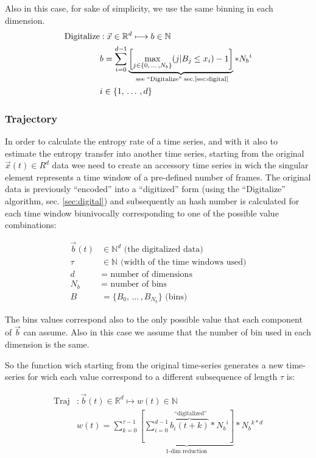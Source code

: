 \documentclass[a4paper]{article}
\begin{document}
Also in this case, for sake of simplicity, we use the same binning in each dimension.
\begin{align*}
 \text{Digitalize} &: \vec{x} \in \mathbb{R}^d \longmapsto b \in \mathbb{N} \\
 { }               & b = \sum_{i=0}^{d-1} \underbrace{\left [ \max_{\substack{j \in \{0,\,\dots\,,N_b\} }} (j | B_j \leq x_i) - 1 \right ]}_{\text{ see ``Digitalize'' sec.\ref{sec:digital}}} * {N_b}^i\\ 
 { }               & i \in \{1,\,\dots\,,d\}
\end{align*}

\subsubsection{Trajectory}\label{sec:traj}
In order to calculate the entropy rate of a time series, and with it also to estimate the entropy transfer into another time series, starting from the original $\vec{x}(t) \in R^d$ data wee need to create an accessory time series in wich the singular element represents a time window of a pre-defined number of frames. The original data is previously ``encoded'' into a ``digitized'' form (using the ``Digitalize'' algorithm, sec. \ref{sec:digital}) and subsequently an hash number is calculated for each time window biunivocally corresponding to one of the possible value combinations:

\begin{align*}
 \vec{b}(t) &\in \mathbb{N}^d \text{ (the digitalized data)}\\
 \tau       &\in \mathbb{N} \text{ (width of the time windows used)}\\
 d          &=   \text{ number of dimensions}\\
 {N_b}      &=   \text{ number of bins} \\
 {B}        &=   \{ B_0,\,\dots\, ,B_{{N_b}} \}\text{ (bins)}
\end{align*}

The bins values correspond also to the only possible value that each component of $\vec{b}$ can assume. Also in this case we assume that the number of bin used in each dimension is the same.

So the function wich starting from the original time-series generates a new time-series for wich each value correspond to a different subsequence of length $\tau$ is:

\begin{align*}
 \text{Traj} &: \vec{b}(t) \in \mathbb{R}^d \longmapsto w(t) \in \mathbb{N} \\
 { }         & w(t) = \sum_{k=0}^{\tau-1} \underbrace{\left [ \sum_{i=0}^{d-1} \overbrace{b_i(t+k)}^{\text{ ``digitalized''}} * {N_b}^i \right ]}_{\text{1-dim reduction}} * {N_b}^{k*d}
\end{align*}
\end{document}
